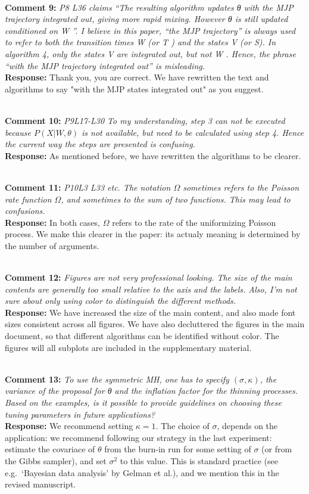 \documentclass[11pt]{article}
\newcommand{\rev}[2]{\textbf{Comment #1: }\emph{#2}}
\newcommand{\resp}{\textbf{Response: }}
\begin{document}
~\\
\rev{9}{P8 L36 claims “The resulting algorithm updates θ with the MJP trajectory integrated out, giving more rapid mixing. However θ is still updated conditioned on W ”. I believe in this paper, “the MJP trajectory” is always used to refer to both the transition times W (or T ) and the states V (or S). In algorithm 4, only the states V are integrated out, but not W . Hence, the phrase “with the MJP trajectory integrated out” is misleading.}\\
\resp{Thank you, you are correct. We have rewritten the text and algorithms to say "with the MJP states integrated out" as you suggest.}

~\\
\rev{10}{P9L17-L30 To my understanding, step 3 can not be executed because $P (X|W, \theta)$ is not available, but need to be calculated using step 4. Hence the current way the steps are presented is confusing.} \\
\resp{As mentioned before, we have rewritten the algorithms to be clearer.}

~\\
\rev{11}{P10L3 L33 etc. The notation $\Omega$ sometimes refers to the Poisson rate function $\Omega$, and sometimes to the sum of two functions. This may lead to confusions.}
~\\ 
\resp{In both cases, $\Omega$ refers to the rate of the uniformizing Poisson process. We make this clearer in the paper: its actualy meaning is determined by the number of arguments}. 

~\\ 
\rev{12}{Figures are not very professional looking. The size of the main contents are generally too small relative to the axis and the labels. Also, I’m not sure about only using color to distinguish the different methods.}\\
\resp{We have increased the size of the main content, and also made font sizes consistent across all figures. We have also decluttered the figures in the main document, so that different algorithms can be identified without color. The figures will all subplots are included in the supplementary material.} 

~\\ 
\rev{13}{To use the symmetric MH, one has to specify $(\sigma, \kappa)$, the variance of the proposal for θ and the inflation factor for the thinning processes. Based on the examples, is it possible to provide guidelines on choosing these tuning parameters in future applications?} 
\\ 
\resp{We recommend setting $\kappa = 1$. The choice of $\sigma$, depends on the application: we recommend following our strategy in the last experiment: estimate the covariace of $\theta$ from the burn-in run for some setting of $\sigma$ (or from the Gibbs sampler), and set $\sigma^2$ to this  value. This is standard practice (see e.g.\ `Bayesian data analysis' by Gelman et al.), and we mention this in the revised manuscript.}
~\\
\end{document}

